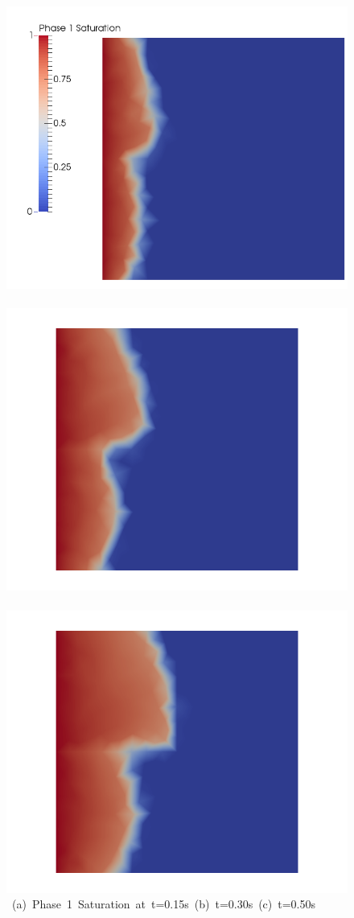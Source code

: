 \begin{landscape}
\begin{figure}[ht] 
\vbox{\vspace{-1cm}
\hspace{0.0cm} \hbox{\includegraphics[width=.56\textwidth]{./Pics/HarmMeanCase/HarmMeanCase_Saturation_t_dot15.png}
      \includegraphics[width=.56\textwidth]{./Pics/HarmMeanCase/HarmMeanCase_Saturation_t_dot30.png}
      \includegraphics[width=.56\textwidth]{./Pics/HarmMeanCase/HarmMeanCase_Saturation_t_dot50.png}}
\vspace{0.cm}
\hbox{\hspace{0.5cm} (a) Phase 1 Saturation at t=0.15s \hspace{3.75cm} (b) t=0.30s \hspace{5.0cm} (c) t=0.50s}
}
\end{figure}
\end{landscape}
